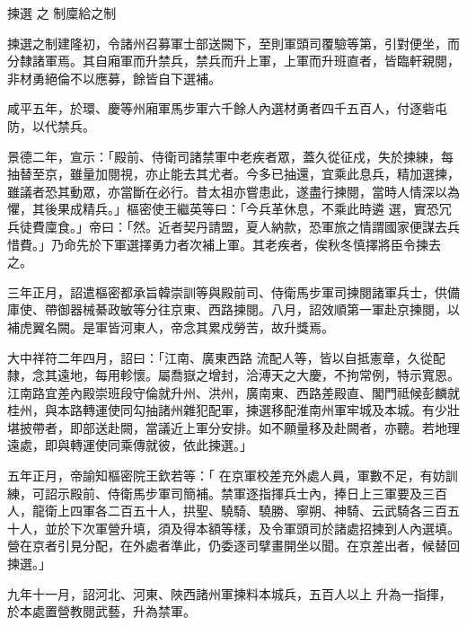 
\begin{pinyinscope}

 揀選
 之
 制廩給之制



 揀選之制建隆初，令諸州召募軍士部送闕下，至則軍頭司覆驗等第，引對便坐，而分隸諸軍焉。其自廂軍而升禁兵，禁兵而升上軍，上軍而升班直者，皆臨軒親閱，
 非材勇絕倫不以應募，餘皆自下選補。



 咸平五年，於環、慶等州廂軍馬步軍六千餘人內選材勇者四千五百人，付逐砦屯防，以代禁兵。



 景德二年，宣示：「殿前、侍衛司諸禁軍中老疾者眾，蓋久從征戍，失於揀練，每抽替至京，雖量加閱視，亦止能去其尤者。今多已抽還，宜乘此息兵，精加選揀，雖議者恐其動眾，亦當斷在必行。昔太祖亦嘗患此，遂盡行揀閱，當時人情深以為懼，其後果成精兵。」樞密使王繼英等曰：「今兵革休息，不乘此時遴
 選，實恐冗兵徒費廩食。」帝曰：「然。近者契丹請盟，夏人納款，恐軍旅之情謂國家便謀去兵惜費。」乃命先於下軍選擇勇力者次補上軍。其老疾者，俟秋冬慎擇將臣令揀去之。



 三年正月，詔遣樞密都承旨韓崇訓等與殿前司、侍衛馬步軍司揀閱諸軍兵士，供備庫使、帶御器械綦政敏等分往京東、西路揀閱。八月，詔效順第一軍赴京揀閱，以補虎翼名闕。是軍皆河東人，帝念其累戍勞苦，故升獎焉。



 大中祥符二年四月，詔曰：「江南、廣東西路
 流配人等，皆以自抵憲章，久從配隸，念其遠地，每用軫懷。屬喬嶽之增封，洽溥天之大慶，不拘常例，特示寬恩。江南路宜差內殿崇班段守倫就升州、洪州，廣南東、西路差殿直、閣門祗候彭麟就桂州，與本路轉運使同勾抽諸州雜犯配軍，揀選移配淮南州軍牢城及本城。有少壯堪披帶者，即部送赴闕，當議近上軍分安排。如不願量移及赴闕者，亦聽。若地理遠處，即與轉運使同乘傳就彼，依此揀選。」



 五年正月，帝諭知樞密院王欽若等：「
 在京軍校差充外處人員，軍數不足，有妨訓練，可詔示殿前、侍衛馬步軍司簡補。禁軍逐指揮兵士內，捧日上三軍要及三百人，龍衛上四軍各二百五十人，拱聖、驍騎、驍勝、寧朔、神騎、云武騎各三百五十人，並於下次軍營升填，須及得本額等樣，及令軍頭司於諸處招揀到人內選填。營在京者引見分配，在外處者準此，仍委逐司擘畫開坐以聞。在京差出者，候替回揀選。」



 九年十一月，詔河北、河東、陜西諸州軍揀料本城兵，五百人以上
 升為一指揮，於本處置營教閱武藝，升為禁軍。




\end{pinyinscope}
